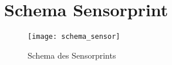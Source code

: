 \section{Schema Sensorprint}

\begin{figure}[h]
\centering
\texttt{[image: schema\_sensor]}
\caption{Schema des Sensorprints}
\end{figure}